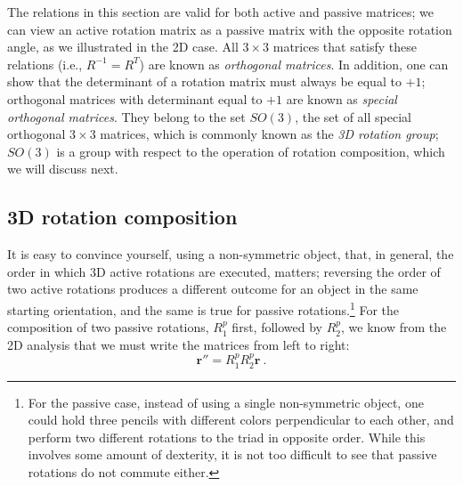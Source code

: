 The relations in this section are valid for both active and passive matrices; we can view an active rotation matrix as a passive matrix with the opposite rotation angle, as we illustrated in the 2D case.  All $3\times 3$ matrices that satisfy these relations (i.e., $R^{-1}=R^T$) are known as \textit{orthogonal matrices}.  In addition, one can show that the determinant of a rotation matrix must always be equal to $+1$; orthogonal matrices with determinant equal to $+1$ are known as \textit{special orthogonal matrices}.  They belong to the set $SO(3)$, the set of all special orthogonal $3\times 3$ matrices, which is commonly known as the \textit{3D rotation group};  $SO(3)$ is a group with respect to the operation of rotation composition, which we will discuss next.

\subsection{3D rotation composition}\label{\chabbr:ssec:3Drotationcomposition}

It is easy to convince yourself, using a non-symmetric object, that, in general, the order in which 3D active rotations are executed, matters; reversing the order of two active rotations produces a different outcome for an object in the same starting orientation, and the same is true for passive rotations.\footnote{For the passive case, instead of using a single non-symmetric object, one could hold three pencils with different colors perpendicular to each other, and perform two different rotations to the triad in opposite order.  While this involves some amount of dexterity, it is not too difficult to see that passive rotations do not commute either.} For the composition of two passive rotations, $R^p_1$ first, followed by $R^p_2$, we know from the 2D analysis that we must write the matrices from left to right:
\begin{equation}
	\mathbf{r}'' = R^p_1 R^p_2\mathbf{r}\ .
\end{equation}

